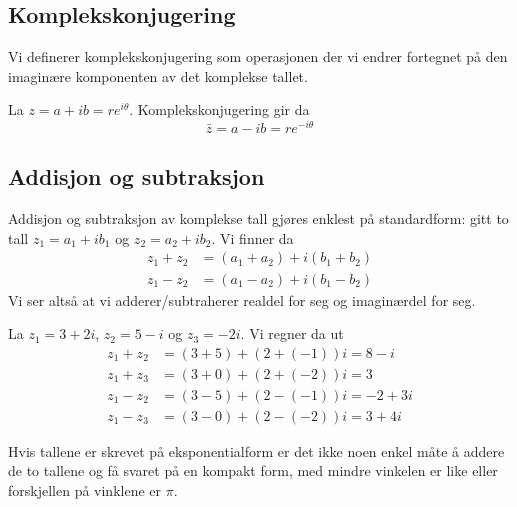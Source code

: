 \documentclass[a4paper,norsk,12pt]{article}
\newcounter{exa}
\begin{document}
\subsection{Komplekskonjugering}
Vi definerer komplekskonjugering som operasjonen der vi endrer fortegnet på den imaginære komponenten av det komplekse tallet. 
\begin{tdef}
	La $z = a + ib = re^{i\theta}$. Komplekskonjugering gir da
	\begin{displaymath}
		\bar{z} = a-ib = re^{-i\theta}
	\end{displaymath}
\end{tdef}

\subsection{Addisjon og subtraksjon}
Addisjon og subtraksjon av komplekse tall gjøres enklest på standardform: gitt to tall $z_1 = a_1 + ib_1$ og $z_2 = a_2 + ib_2$. Vi finner da
\begin{align*}
	z_1 + z_2 &= (a_1+a_2) + i(b_1+b_2) \\
	z_1 - z_2 &= (a_1-a_2) + i(b_1-b_2) 
\end{align*}
Vi ser altså at vi adderer/subtraherer realdel for seg og imaginærdel for seg.

\begin{texample}
	La $z_1 = 3+ 2i$, $z_2 = 5-i$ og $z_3 = -2i$. Vi regner da ut
	\begin{align*}
		z_1 + z_2 &= (3+5) + (2+(-1))i = 8 - i \\ 
		z_1 + z_3 &= (3+0) + (2+(-2))i = 3 \\
		z_1 - z_2 &= (3-5) + (2-(-1))i = -2 + 3i \\ 
		z_1 - z_3 &= (3-0) + (2-(-2))i = 3 + 4i 
	\end{align*}
\end{texample}
Hvis tallene er skrevet på eksponentialform er det ikke noen enkel måte å addere de to tallene og få svaret på en kompakt form, med mindre vinkelen er like eller forskjellen på vinklene er $\pi$.
\end{document}
